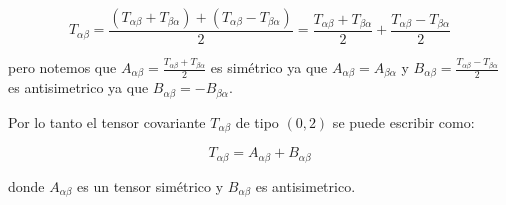 \documentclass[12pt,a4paper]{article}
\begin{document}
\begin{enumerate}
\begin{equation*}
    T_{\alpha \beta} = \frac{(T_{\alpha \beta} + T_{ \beta \alpha}) +(T_{\alpha \beta} - T_{\beta \alpha})}{2} = \frac{T_{\alpha \beta} + T_{\beta \alpha}}{2} + \frac{T_{\alpha \beta} - T_{\beta \alpha}}{2}
\end{equation*}

pero notemos que $A_{\alpha \beta}=\frac{T_{\alpha \beta}+ T_{\beta \alpha}}{2}$ es simétrico ya que $A_{\alpha \beta} = A_{\beta \alpha}$ y $B_{\alpha \beta} = \frac{T_{\alpha \beta} - T_{\beta \alpha}}{2}$ es antisimetrico ya que $B_{\alpha  \beta} = - B_{\beta \alpha}$.

Por lo tanto el tensor covariante $T_{\alpha \beta}$ de tipo $(0,2)$ se puede escribir como:

\begin{equation*}
    T_{\alpha \beta} = A_{\alpha \beta} + B_{\alpha \beta}
\end{equation*}

donde $A_{\alpha \beta}$ es un tensor simétrico y $B_{\alpha \beta}$ es antisimetrico.
    
    
\end{enumerate}
\end{document}
